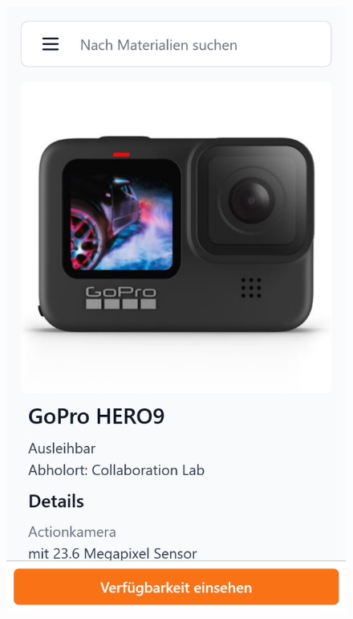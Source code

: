 \begin{figure}[p]
    \includegraphics[scale=0.17]{Bilder/Dialgobeispiel/Details 1.png} \hspace{1em}

\end{figure}
